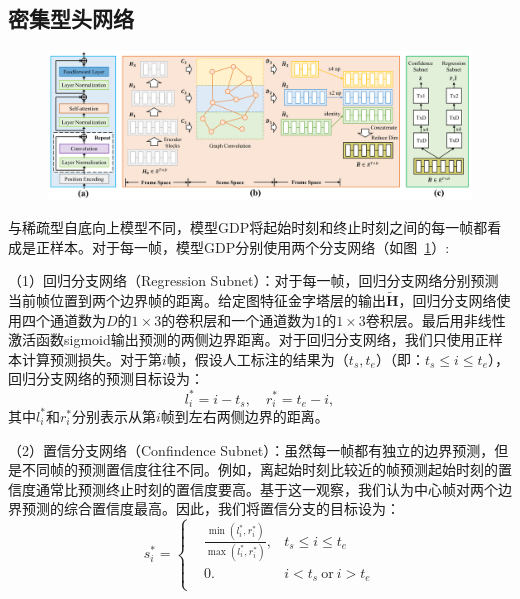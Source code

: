 \subsection{密集型头网络}

\begin{figure}
    \centering
        \includegraphics[width=0.9\linewidth]{chapter6/res/head_network.pdf}
    \label{ch3:fig:head_network}
\end{figure}

与稀疏型自底向上模型不同，模型GDP将起始时刻和终止时刻之间的每一帧都看成是正样本。对于每一帧，模型GDP分别使用两个分支网络（如图~\ref{ch3:fig:head_network}）:

（1）回归分支网络（Regression Subnet）：对于每一帧，回归分支网络分别预测当前帧位置到两个边界帧的距离。给定图特征金字塔层的输出$\tilde{\bm{H}}$，回归分支网络使用四个通道数为$D$的$1\times3$的卷积层和一个通道数为1的$1\times3$卷积层。最后用非线性激活函数sigmoid输出预测的两侧边界距离。对于回归分支网络，我们只使用正样本计算预测损失。对于第$i$帧，假设人工标注的结果为（$t_s, t_e$）（即：$t_s \leq i \leq t_e$），回归分支网络的预测目标设为：
\begin{equation}
    l^*_i = i - t_s, \quad r^*_i = t_e - i,
\end{equation}
其中$l^*_i$和$r^*_i$分别表示从第$i$帧到左右两侧边界的距离。

（2）置信分支网络（Confindence Subnet）：虽然每一帧都有独立的边界预测，但是不同帧的预测置信度往往不同。例如，离起始时刻比较近的帧预测起始时刻的置信度通常比预测终止时刻的置信度要高。基于这一观察，我们认为中心帧对两个边界预测的综合置信度最高。因此，我们将置信分支的目标设为：
\begin{equation}
s^*_i=\left\{
    \begin{aligned}
        & \frac{\min(l^*_i, r^*_i)}{\max(l^*_i, r^*_i)}, & t_s \leq i \leq t_e \\
        & 0.  & i < t_s ~\text{or}~ i > t_e \\
    \end{aligned}
    \right.
\end{equation}

